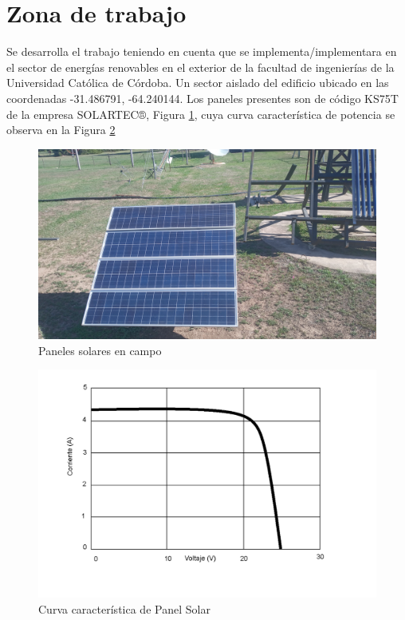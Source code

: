 \section{Zona de trabajo}
Se desarrolla el trabajo teniendo en cuenta que se implementa/implementara en el sector de energías renovables en el exterior de la facultad de ingenierías de la Universidad Católica de Córdoba. Un sector aislado del edificio ubicado en las coordenadas -31.486791, -64.240144. Los paneles presentes son de código KS75T de la empresa SOLARTEC®, Figura \ref{fig:panelsolarencampo}, cuya curva característica de potencia se observa en la Figura \ref{fig:curvadepaneldata}
\begin{figure}
    \centering
    \includegraphics[width=1\linewidth,frame]{imagenes/panelsolarencampofrontal.jpg}
    \caption{Paneles solares en campo}
    \label{fig:panelsolarencampo}
\end{figure}
\begin{figure}
    \centering
    \includegraphics[width=1\linewidth,frame]{imagenes/curvapaneldata.png}
    \caption{Curva característica de Panel Solar}
    \label{fig:curvadepaneldata}
\end{figure}

